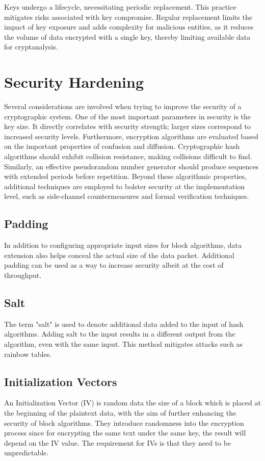 Keys undergo a lifecycle, necessitating periodic replacement. This practice mitigates risks associated with key compromise. Regular replacement limits the impact of key exposure and adds complexity for malicious entities, as it reduces the volume of data encrypted with a single key, thereby limiting available data for cryptanalysis.

\section{Security Hardening}
Several considerations are involved when trying to improve the security of a cryptographic system. One of the most important parameters in security is the key size. It directly correlates with security strength; larger sizes correspond to increased security levels. Furthermore, encryption algorithms are evaluated based on the important properties of confusion and diffusion. Cryptographic hash algorithms should exhibit collision resistance, making collisions difficult to find. Similarly, an effective pseudorandom number generator should produce sequences with extended periods before repetition. Beyond these algorithmic properties, additional techniques are employed to bolster security at the implementation level, such as side-channel countermeasures and formal verification techniques.


\subsection{Padding}
In addition to configuring appropriate input sizes for block algorithms, data extension also helps conceal the actual size of the data packet. Additional padding can be used as a way to increase security albeit at the cost of throughput.


\subsection{Salt}
The term "salt" is used to denote additional data added to the input of hash algorithms. Adding salt to the input results in a different output from the algorithm, even with the same input. This method mitigates attacks such as rainbow tables.


\subsection{Initialization Vectors}
An Initialization Vector (IV) is random data the size of a block which is placed at the beginning of the plaintext data, with the aim of further enhancing the security of block algorithms. They introduce randomness into the encryption process since for encrypting the same text under the same key, the result will depend on the IV value. The requirement for IVs is that they need to be unpredictable.







